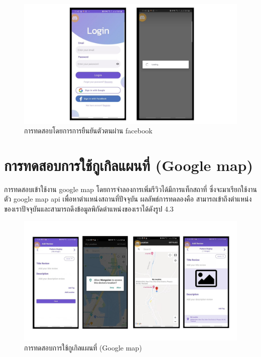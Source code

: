    \begin{figure}
    \begin{center}
      \includegraphics[width=1\textwidth]{./image/testing/Slide2.JPG}
    \end{center}
    \caption[การทดสอบโดยการการยืนยันตัวตนผ่าน facebook]{การทดสอบโดยการการยืนยันตัวตนผ่าน facebook}
    \end{figure}


\section{การทดสอบการใช้กูเกิลแผนที่ (Google map)}
    การทดสอบเข้าใช้งาน google map โดยการจำลองการเพิ่มรีวิวได้มีการแท็กสถาที่ ซึ่งจะมาเรียกใช้งานตัว google map api เพื่อหาตำเเหน่งสถานที่ปัจจุบัน
ผลลัพธ์การทดลองคือ สามารถเข้าถึงตำแหน่งของเราปัจจุบันและสามารถดึงข้อมูลพิกัดตำแหน่งของเราได้ดังรูป 4.3
\begin{figure}
    \begin{center}
      \includegraphics[width=1\textwidth]{./image/testing/Slide3.JPG}
    \end{center}
    \caption[การทดสอบการใช้กูเกิลแผนที่]{การทดสอบการใช้กูเกิลแผนที่ (Google map)}
    \end{figure}

